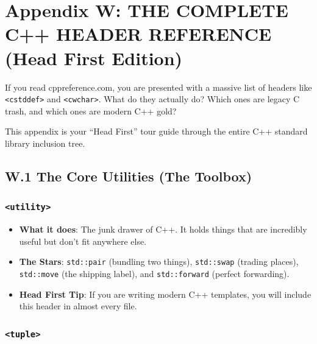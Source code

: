 \hypertarget{appendix-w-the-complete-c-header-reference-head-first-edition}{%
\section{Appendix W: THE COMPLETE C++ HEADER REFERENCE (Head First
Edition)}\label{appendix-w-the-complete-c-header-reference-head-first-edition}}

If you read cppreference.com, you are presented with a massive list of
headers like \passthrough{\lstinline!<cstddef>!} and
\passthrough{\lstinline!<cwchar>!}. What do they actually do? Which ones
are legacy C trash, and which ones are modern C++ gold?

This appendix is your ``Head First'' tour guide through the entire C++
standard library inclusion tree.

\hypertarget{w.1-the-core-utilities-the-toolbox}{%
\subsection{W.1 The Core Utilities (The
Toolbox)}\label{w.1-the-core-utilities-the-toolbox}}

\hypertarget{utility}{%
\subsubsection{\texorpdfstring{\texttt{\textless{}utility\textgreater{}}}{\textless utility\textgreater{}}}\label{utility}}

\begin{itemize}
\tightlist
\item
  \textbf{What it does}: The junk drawer of C++. It holds things that
  are incredibly useful but don't fit anywhere else.
\item
  \textbf{The Stars}: \passthrough{\lstinline!std::pair!} (bundling two
  things), \passthrough{\lstinline!std::swap!} (trading places),
  \passthrough{\lstinline!std::move!} (the shipping label), and
  \passthrough{\lstinline!std::forward!} (perfect forwarding).
\item
  \textbf{Head First Tip}: If you are writing modern C++ templates, you
  will include this header in almost every file.
\end{itemize}

\hypertarget{tuple}{%
\subsubsection{\texorpdfstring{\texttt{\textless{}tuple\textgreater{}}}{\textless tuple\textgreater{}}}\label{tuple}}

